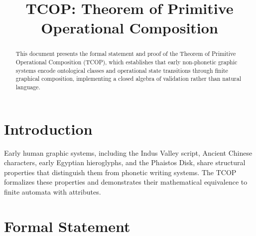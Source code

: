 \documentclass[12pt,a4paper]{article}
\title{TCOP: Theorem of Primitive Operational Composition}
\author{}
\date{}
\begin{document}
\maketitle

\begin{abstract}
This document presents the formal statement and proof of the Theorem of Primitive Operational Composition (TCOP), which establishes that early non-phonetic graphic systems encode ontological classes and operational state transitions through finite graphical composition, implementing a closed algebra of validation rather than natural language.
\end{abstract}

\section{Introduction}

Early human graphic systems, including the Indus Valley script, Ancient Chinese characters, early Egyptian hieroglyphs, and the Phaistos Disk, share structural properties that distinguish them from phonetic writing systems. The TCOP formalizes these properties and demonstrates their mathematical equivalence to finite automata with attributes.

\section{Formal Statement}
\end{document}

